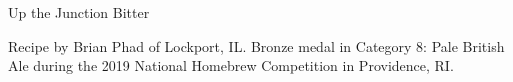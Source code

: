 \begin{recipe}{Up the Junction Bitter}

\begin{aboutblock}
Recipe by Brian Phad of Lockport, IL. Bronze medal in Category 8: Pale British Ale
during the 2019 National Homebrew Competition in Providence, RI. \sourceaha
\end{aboutblock}


\begin{methodandtiming}
 
\begin{mashsteps}
\end{mashsteps}

\begin{fermentationsteps}
\end{fermentationsteps}

\end{methodandtiming}

\recipebreak

\begin{ingredientsblock}

\begin{malts}
\end{malts}

\begin{hops}
\end{hops}


\end{ingredientsblock}

\end{recipe}
